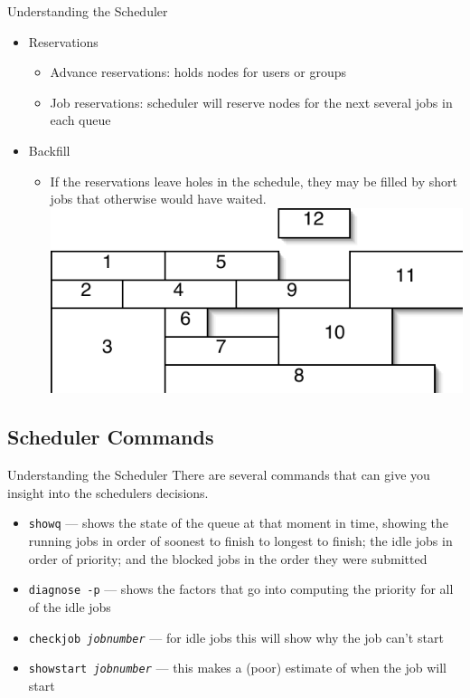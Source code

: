 \documentclass[handout]{beamer}
\begin{document}
\begin{frame}{Understanding the Scheduler}
  \begin{itemize}
  \item<1-> Reservations
    \begin{itemize}
    \item<1-> Advance reservations: holds nodes for users or groups
    \item<1-> Job reservations: scheduler will reserve nodes for the next
several jobs in each queue
    \end{itemize}
  \item<2-> Backfill
    \begin{itemize}
    \item<2-> If the reservations leave holes in the schedule, they may be
filled by short jobs that otherwise would have waited.\\
	\includegraphics{job-grid}
    \end{itemize}
  \end{itemize}
\end{frame}
\subsection{Scheduler Commands}
\begin{frame}{Understanding the Scheduler}
There are several commands that can give you insight into the schedulers
decisions.
\begin{itemize}
\item \texttt{showq} --- shows the state of the queue at that moment in time,
showing the running jobs in order of soonest to finish to longest to finish; the
idle jobs in order of priority; and the blocked jobs in the order they were
submitted
\item \texttt{diagnose -p} --- shows the factors that go into computing the
priority for all of the idle jobs
\item \texttt{checkjob \textit{jobnumber}} --- for idle jobs this will show why
the job can't start
\item \texttt{showstart \textit{jobnumber}} --- this makes a (poor) estimate of
when the job will start
\end{itemize}
\end{frame}
\end{document}
